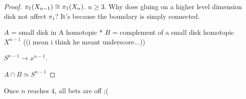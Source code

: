 \documentclass[11pt,leqno,oneside]{amsart}
\numberwithin{thm}{section}
\newcommand{\homotopic}{\simeq}
\newcommand{\fund}[1][1]{\pi_{#1}}
\begin{document}
\begin{proof}
  $\fund(X_{n-1}) \isom \fund(X_n)$.  $n \geq 3$.
  Why does gluing on a higher level dimension disk not affect $\fund$?  It's because the boundary is simply connected.

  $A$ = small disk in A homotopic *
  $B$ = complement of a small disk homotopic $X^{n-1}$ ((i mean i think he meant underscore...))

  $S^{n-1} \to x^{n-1}$.

  $A \cap B \homotopic S^{n-1}$
\end{proof}
\begin{rmk}
  Once $n$ reaches $4$, all bets are off ;(
\end{rmk}




\begin{bibdiv}
\begin{biblist}
\end{biblist}
\end{bibdiv}
\end{document}
